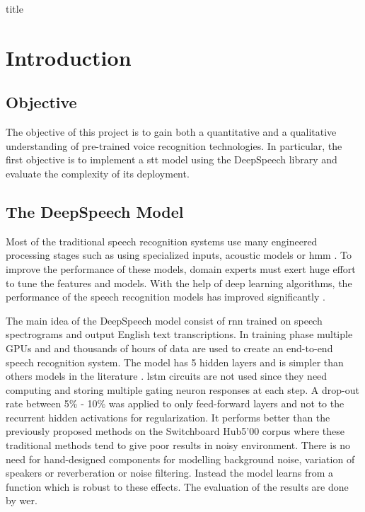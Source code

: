 \documentclass[12pt]{article}
\begin{document}
{title}

\tableofcontents







\newpage
{}



\section{Introduction}
\subsection{Objective}
The objective of this project is to gain both a quantitative and a qualitative understanding of pre-trained voice recognition technologies. In particular, the first objective is to implement a \gls{stt} model using the DeepSpeech \cite{deepspeech_paper} library and evaluate the complexity of its deployment.

\subsection{The DeepSpeech Model}
Most of the traditional speech recognition systems use many engineered processing stages such as using specialized inputs, acoustic models or \gls{hmm} \cite{acoustic_model,hmm}. To improve the performance of these models, domain experts must exert huge effort to tune the features and models. With the help of deep learning algorithms, the performance of the speech recognition models has improved significantly \cite{dl1,dl2,dl3,dl4}.


The main idea of the DeepSpeech model \cite{deepspeech_paper} consist of \gls{rnn} trained on speech spectrograms and output English text transcriptions. In training phase multiple GPUs and and thousands of hours of data are used to create an end-to-end speech recognition system. The model has 5 hidden layers and is simpler than others models in the literature \cite{other_model1}. \gls{lstm} circuits are not used since they need computing and storing multiple gating neuron responses at each step. A drop-out rate between 5\% - 10\% was applied to only feed-forward layers and not to the recurrent hidden activations for regularization. It performs better than the previously proposed methods on the Switchboard Hub5'00 corpus where these traditional methods tend to give poor results in noisy environment. There is no need for hand-designed components for modelling background noise, variation of speakers or reverberation or noise filtering. Instead the model learns from a function which is robust to these effects. The evaluation of the results are done by \gls{wer}.
\end{document}
